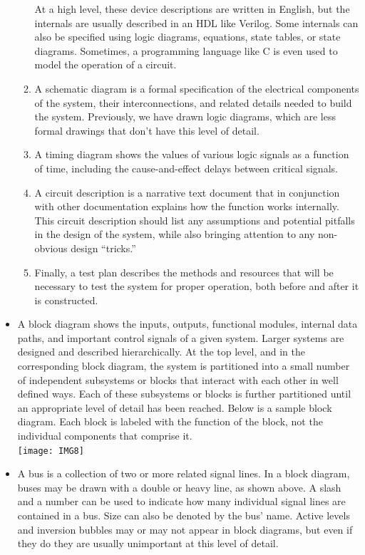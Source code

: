 \documentclass[10pt,a4paper]{article}
\begin{document}
\begin{itemize}
\begin{enumerate}
At a high level, these device descriptions are written in English, but the internals are usually described in an HDL like Verilog. Some internals can also be specified using logic diagrams, equations, state tables, or state diagrams. Sometimes, a programming language like C is even used to model the operation of a circuit.
\item A schematic diagram is a formal specification of the electrical components of the system, their interconnections, and related details needed to build the system. Previously, we have drawn logic diagrams, which are less formal drawings that don't have this level of detail. 
\item A timing diagram shows the values of various logic signals as a function of time, including the cause-and-effect delays between critical signals.
\item A circuit description is a narrative text document that in conjunction with other documentation explains how the function works internally. This circuit description should list any assumptions and potential pitfalls in the design of the system, while also bringing attention to any non-obvious design ``tricks.'' 
\item Finally, a test plan describes the methods and resources that will be necessary to test the system for proper operation, both before and after it is constructed.
\end{enumerate}
\item A block diagram shows the inputs, outputs, functional modules, internal data paths, and important control signals of a given system. Larger systems are designed and described hierarchically. At the top level, and in the corresponding block diagram, the system is partitioned into a small number of independent subsystems or blocks that interact with each other in well defined ways. Each of these subsystems or blocks is further partitioned until an appropriate level of detail has been reached. Below is a sample block diagram. Each block is labeled with the function of the block, not the individual components that comprise it.\\
\texttt{[image: IMG8]}
\item A bus is a collection of two or more related signal lines. In a block diagram, buses may be drawn with a double or heavy line, as shown above. A slash and a number can be used to indicate how many individual signal lines are contained in a bus. Size can also be denoted by the bus' name. Active levels and inversion bubbles may or may not appear in block diagrams, but even if they do they are usually unimportant at this level of detail. 

\end{itemize}
\end{document}
